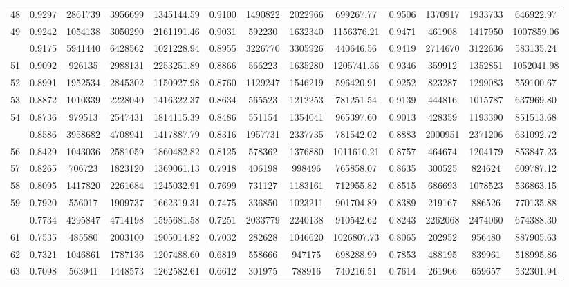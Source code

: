 \documentclass[
  12pt,
]{article}
\begin{document}
\begin{longtable}[t]{lcccccccccccc}
48 & 0.9297 & 2861739 & 3956699 & 1345144.59 & 0.9100 & 1490822 & 2022966 & 699267.77 & 0.9506 & 1370917 & 1933733 & 646922.97\\
49 & 0.9242 & 1054138 & 3050290 & 2161191.46 & 0.9031 & 592230 & 1632340 & 1156376.21 & 0.9471 & 461908 & 1417950 & 1007859.06\\
\addlinespace
50 & 0.9175 & 5941440 & 6428562 & 1021228.94 & 0.8955 & 3226770 & 3305926 & 440646.56 & 0.9419 & 2714670 & 3122636 & 583135.24\\
51 & 0.9092 & 926135 & 2988131 & 2253251.89 & 0.8866 & 566223 & 1635280 & 1205741.56 & 0.9346 & 359912 & 1352851 & 1052041.98\\
52 & 0.8991 & 1952534 & 2845302 & 1150927.98 & 0.8760 & 1129247 & 1546219 & 596420.91 & 0.9252 & 823287 & 1299083 & 559100.67\\
53 & 0.8872 & 1010339 & 2228040 & 1416322.37 & 0.8634 & 565523 & 1212253 & 781251.54 & 0.9139 & 444816 & 1015787 & 637969.80\\
54 & 0.8736 & 979513 & 2547431 & 1814115.39 & 0.8486 & 551154 & 1354041 & 965397.60 & 0.9013 & 428359 & 1193390 & 851513.68\\
\addlinespace
55 & 0.8586 & 3958682 & 4708941 & 1417887.79 & 0.8316 & 1957731 & 2337735 & 781542.02 & 0.8883 & 2000951 & 2371206 & 631092.72\\
56 & 0.8429 & 1043036 & 2581059 & 1860482.82 & 0.8125 & 578362 & 1376880 & 1011610.21 & 0.8757 & 464674 & 1204179 & 853847.23\\
57 & 0.8265 & 706723 & 1823120 & 1369061.13 & 0.7918 & 406198 & 998496 & 765858.07 & 0.8635 & 300525 & 824624 & 609787.12\\
58 & 0.8095 & 1417820 & 2261684 & 1245032.91 & 0.7699 & 731127 & 1183161 & 712955.82 & 0.8515 & 686693 & 1078523 & 536863.15\\
59 & 0.7920 & 556017 & 1909737 & 1662319.31 & 0.7475 & 336850 & 1023211 & 901704.89 & 0.8389 & 219167 & 886526 & 770135.88\\
\addlinespace
60 & 0.7734 & 4295847 & 4714198 & 1595681.58 & 0.7251 & 2033779 & 2240138 & 910542.62 & 0.8243 & 2262068 & 2474060 & 674388.30\\
61 & 0.7535 & 485580 & 2003100 & 1905014.82 & 0.7032 & 282628 & 1046620 & 1026807.73 & 0.8065 & 202952 & 956480 & 887905.63\\
62 & 0.7321 & 1046861 & 1787136 & 1207488.60 & 0.6819 & 558666 & 947175 & 698288.99 & 0.7853 & 488195 & 839961 & 518995.86\\
63 & 0.7098 & 563941 & 1448573 & 1262582.61 & 0.6612 & 301975 & 788916 & 740216.51 & 0.7614 & 261966 & 659657 & 532301.94\\

\end{longtable}
\end{document}
